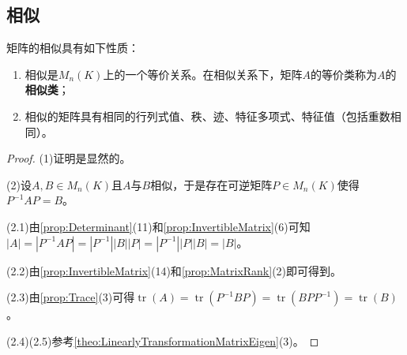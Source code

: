\subsection{相似}
\begin{property}\label{prop:SimilarMatrix}
	矩阵的相似具有如下性质：
	\begin{enumerate}
		\item 相似是$M_{n}(K)$上的一个等价关系。在相似关系下，矩阵$A$的等价类称为$A$的\textbf{相似类}；
		\item 相似的矩阵具有相同的行列式值、秩、迹、特征多项式、特征值（包括重数相同）。
	\end{enumerate}
\end{property}
\begin{proof}
	(1)证明是显然的。\par
	(2)设$A,B\in M_{n}(K)$且$A$与$B$相似，于是存在可逆矩阵$P\in M_{n}(K)$使得$P^{-1}AP=B$。\par
	(2.1)由\cref{prop:Determinant}(11)和\cref{prop:InvertibleMatrix}(6)可知$|A|=|P^{-1}AP|=|P^{-1}||B||P|=|P^{-1}||P||B|=|B|$。\par
	(2.2)由\cref{prop:InvertibleMatrix}(14)和\cref{prop:MatrixRank}(2)即可得到。\par
	(2.3)由\cref{prop:Trace}(3)可得$\operatorname{tr}(A)=\operatorname{tr}(P^{-1}BP)=\operatorname{tr}(BPP^{-1})=\operatorname{tr}(B)$。\par
	(2.4)(2.5)参考\cref{theo:LinearlyTransformationMatrixEigen}(3)。
\end{proof}

